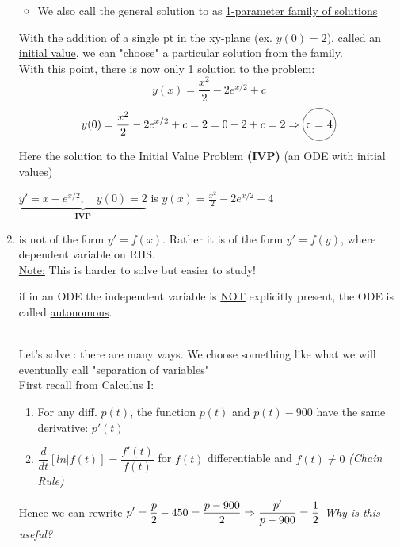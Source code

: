 \begin{enumerate}[label=\protect\circled{\arabic*}]
\begin{itemize}
\begin{center}
\begin{tikzpicture}
		\end{tikzpicture}
		\end{center}
	\item We also call the general solution to  as \underline{1-parameter family of solutions}
	\end{itemize}
	With the addition of a single pt in the xy-plane (ex. $y(0) = 2$), called an \underline{initial value}, we can "choose" a particular solution from the family.\\
	With this point, there is now only 1 solution to the problem:
	\begin{equation*}
		y(x) = \frac{x^2}{2} - 2e^{x/2} + c
	\end{equation*}
	\begin{equation*}
		y(0) = \frac{x^2}{2} - 2e^{x/2} + c = 2
		= 0 -2 + c=2\Rightarrow \circled{c = 4}
	\end{equation*}
	Here the solution to the Initial Value Problem \textbf{(IVP)} (an ODE with initial values)
	\begin{center}
		$\underbrace{y' = x-e^{x/2}, \quad y(0)=2}_{\textbf{IVP}}$ is $y(x) = \frac{x^2}{2} - 2e^{x/2} + 4$
	\end{center}
	\item {} is not of the form $y' = f(x)$. Rather it is of the form $y' = f(y)$, where dependent variable on RHS.\\
	\underline{Note:} This is harder to solve but easier to study!
	\begin{definition-N}
		if in an ODE the independent variable is \underline{NOT} explicitly present, the ODE is called \underline{autonomous}.
	\end{definition-N}
	\redhline\\
	Let's solve : there are many ways. We choose something like what we will eventually call "separation of variables"\newline \\
	First recall from Calculus I:
	\begin{enumerate}[label=\protect\circled{\Roman*}]
	\item For any diff. $p(t)$, the function $p(t)$ and $p(t) - 900$ have the same derivative: $p'(t)$
	\item $\dfrac{d}{dt}[ln|f(t)] = \dfrac{f'(t)}{f(t)}$ for $f(t)$ differentiable and $f(t) \neq 0$ \quad \textit{(Chain Rule)}
	\end{enumerate}
	Hence we can rewrite $\mathlarger{p' = \frac{p}{2} - 450 = \frac{p-900}{2} \Rightarrow \frac{p'}{p-900} = \frac{1}{2}}$ \quad \textit{Why is this useful?}\\

\end{enumerate}
